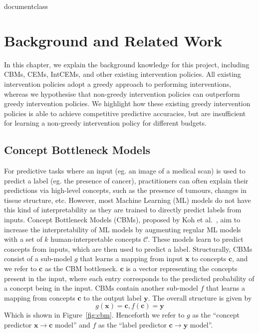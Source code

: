 \csname documentclass

\chapter{Background and Related Work}

In this chapter, we explain the background knowledge
for this project, including CBMs, CEMs, IntCEMs,
and other existing intervention policies. All existing 
intervention policies adopt a greedy approach to performing interventions,
whereas we hypothesise that non-greedy intervention policies can outperform greedy intervention policies.
We highlight how these existing greedy intervention policies is able to achieve competitive 
predictive accuracies,
but are insufficient
for learning a non-greedy
intervention policy for different budgets.

\section{Concept Bottleneck Models}\label{background:cbm}
For predictive tasks where an input (eg. an image of a medical scan)
is used to predict a label (eg. the presence of cancer),
practitioners can often explain their predictions
via high-level concepts, such as the presence of tumours,
changes in tissue structure, etc. However, 
most Machine Learning (ML) models do not have this kind of interpretability as they are trained to directly
predict labels from inputs.
Concept Bottleneck Models (CBMs), proposed by Koh et al.~\cite{cbm}, aim to increase the interpretability 
of ML models
by augmenting regular ML models with a set of $k$
human-interpretable concepts $\mathcal{C}$. These models learn to predict concepts from inputs, which are then used to predict a label.
Structurally, CBMs consist of a sub-model $g$ that learns a mapping from
input $\mathbf{x}$ to concepts $\mathbf{c}$, and we refer to $\mathbf{c}$
as the CBM bottleneck.
$\mathbf{c}$ is a vector representing the concepts present in the input, 
where each entry corresponds to the predicted probability of a concept being in the input.
CBMs contain another sub-model $f$
that learns a mapping from concepts $\mathbf{c}$
to the output label $\mathbf{y}$.
The overall structure is given by
\[g(\mathbf{x}) = \mathbf{c}, f(\mathbf{c}) = \mathbf{y}\]
Which is shown in Figure~\ref{fig:cbm}.
Henceforth we refer to $g$ as the ``concept predictor $\mathbf{x} \to \mathbf{c}$ model'' and $f$ as the
``label  predictor $\mathbf{c} \to \mathbf{y}$ model''.

